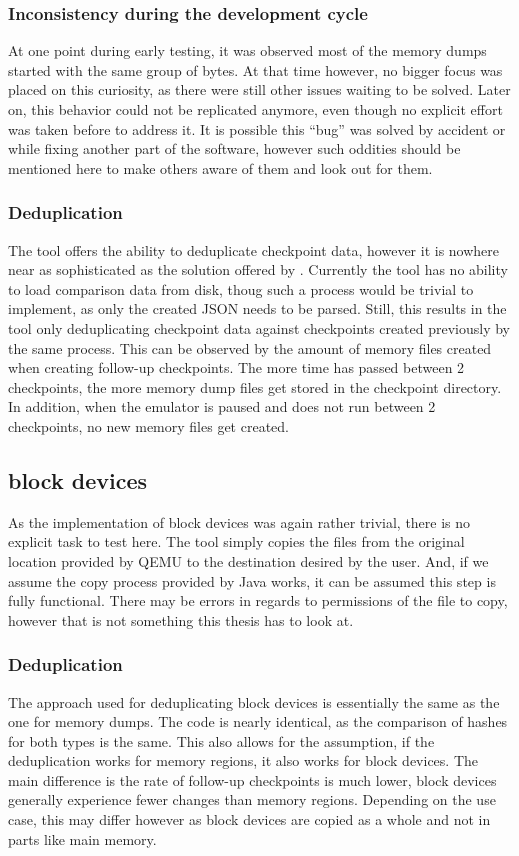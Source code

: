 \subsubsection*{Inconsistency during the development cycle}
At one point during early testing,
it was observed most of the memory dumps started with the same group of bytes.
At that time however, no bigger focus was placed on this curiosity,
as there were still other issues waiting to be solved.
Later on, this behavior could not be replicated anymore,
even though no explicit effort was taken before to address it.
It is possible this \enquote{bug} was solved by accident
or while fixing another part of the software,
however such oddities should be mentioned here to make others aware of them and look out for them.

\subsubsection*{Deduplication}
The tool offers the ability to deduplicate checkpoint data,
however it is nowhere near as sophisticated as the solution offered by \citeauthor{kitcheckpoints}.
Currently the tool has no ability to load comparison data from disk,
thoug such a process would be trivial to implement,
as only the created JSON needs to be parsed.
Still, this results in the tool only deduplicating checkpoint data
against checkpoints created previously by the same process.
This can be observed by the amount of memory files created
when creating follow-up checkpoints.
The more time has passed between 2 checkpoints,
the more memory dump files get stored in the checkpoint directory.
In addition, when the emulator is paused and does not run between 2 checkpoints, no new memory files get created.

\subsection{block devices}
As the implementation of block devices was again rather trivial,
there is no explicit task to test here.
The tool simply copies the files from the original location provided by QEMU
to the destination desired by the user.
And, if we assume the copy process provided by Java works,
it can be assumed this step is fully functional.
There may be errors in regards to permissions of the file to copy,
however that is not something this thesis has to look at.

\subsubsection*{Deduplication}
The approach used for deduplicating block devices is essentially the same as the one for memory dumps.
The code is nearly identical, as the comparison of hashes for both types is the same.
This also allows for the assumption, if the deduplication works for memory regions,
it also works for block devices.
The main difference is the rate of follow-up checkpoints is much lower,
block devices generally experience fewer changes than memory regions.
Depending on the use case, this may differ however as block devices are copied as a whole and not in parts like main memory.

